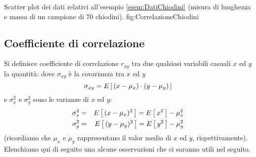 \panelfig
{}
{Scatter plot dei dati relativi all'esempio \ref{esem:DatiChiodini}
(misura di lunghezza e massa di un campione di 70 chiodini).}
{fig:CorrelazioneChiodini}

\subsection{Coefficiente di correlazione}
\label{sub:CoeffCorrelazione}

Si definisce coefficiente di correlazione $r_{xy}$ tra due qualsiasi variabili
casuali $x$ ed $y$ la quantit\`a:
dove $\sigma_{xy}$ \`e la covarianza tra $x$ ed $y$
$$
\sigma_{xy} = \displaystyle E\left[\, (x-\mu_{x})\cdot(y-\mu_{y}) \, \right]
$$
e $\sigma^2_x$ e $\sigma^2_y$ sono le varianze di $x$ ed $y$:
\begin{eqnarray*}
\sigma_x^2 & = & \displaystyle E\left[\, (x-\mu_{x})^2 \, \right] = \displaystyle E\left[\, x^2 \, \right] - \mu_{x}^2\\
\sigma_y^2 & = & \displaystyle E\left[\, (y-\mu_{y})^2 \, \right] = \displaystyle E\left[\, y^2 \, \right] - \mu_{y}^2
\end{eqnarray*}
(ricordiamo che $\mu_{x}$ e $\mu_{y}$ rappresentano il valor
medio di $x$ ed $y$, rispettivamente).
Elenchiamo qui di seguito una alcune osservazioni che ci saranno utili
nel seguito.

